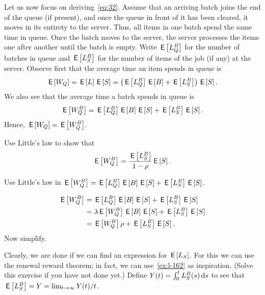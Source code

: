 Let us now focus on deriving~\cref{eq:32}.
Assume that an arriving batch joins the end of the queue (if present), and once the queue in front of it has been cleared, it moves in its entirety to the server.
Thus, all items in one batch spend the same time in queue.
Once the batch moves to the server, the server processes the items one after another until the batch is empty.
Write $\E{L_Q^B}$ for the number of batches in queue and $\E{L_S^B}$ for the number of items of the job (if any) at the server.  Observe first that the average time an item spends in queue is
\begin{align*}
  \E{W_Q} = \E L \E S = \left(\E{L_Q^B} \E B + \E{L_S^B}\right)\E S.
\end{align*}
We also see that the average time a batch spends in queue is 
\begin{align*}
  \E{W_Q^B} = \E{L_Q^B} \E B \E S + \E{L_S^B}\E S.
\end{align*}
Hence, $\E{W_Q} = \E{W_Q^B}$. 

\begin{exercise}
Use Little's law to show that
 \begin{equation}\label{eq:96}
 \E{W^B_{Q}} = \frac{\E{L_S^B}}{1-\rho}\E{S}.
 \end{equation}
    \begin{hint}
  Use Little's law in $\E{W_Q^B} = \E{L_Q^B} \E B \E S + \E{L_S^B}\E S$. 
\end{hint}
\begin{solution}
  \begin{align*}
  \E{W_Q^B} &= \E{L_Q^B} \E B \E S + \E{L_S^B}\E S \\
  &= \lambda \E{W_Q^B}  \E B \E S + \E{L_S^B}\E S \\
  &= \E{W_Q^B} \rho + \E{L_S^B}\E S.
  \end{align*}
Now simplify.
\end{solution}
\end{exercise}

Clearly, we are done if we can find an expression for $\E{L_S}$.
For this we can use the renewal reward theorem; in fact, we can use~\cref{ex:l-162} as inspiration.
(Solve this exercise if you have not done yet.) Define $Y(t) = \int_0^t L_S^B(s) \d s$ to  see that $\E{L_S^B} = Y = \lim_{t\to\infty} Y(t)/t$. 

